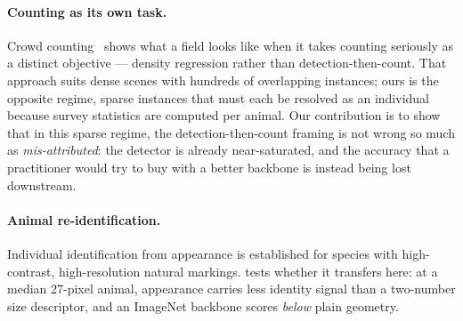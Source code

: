 \paragraph{Counting as its own task.}
Crowd counting~\cite{zhang2016single} shows what a field looks like when it takes counting
seriously as a distinct objective --- density regression rather than detection-then-count.
That approach suits dense scenes with hundreds of overlapping instances; ours is the
opposite regime, sparse instances that must each be resolved as an individual because
survey statistics are computed per animal. Our contribution is to show that in this sparse
regime, the detection-then-count framing is not wrong so much as \emph{mis-attributed}: the
detector is already near-saturated, and the accuracy that a practitioner would try to buy
with a better backbone is instead being lost downstream.

\paragraph{Animal re-identification.}
Individual identification from appearance is established for species with high-contrast,
high-resolution natural markings.  tests whether it transfers here: at a
median 27-pixel animal, appearance carries less identity signal than a two-number size
descriptor, and an ImageNet backbone scores \emph{below} plain geometry.
